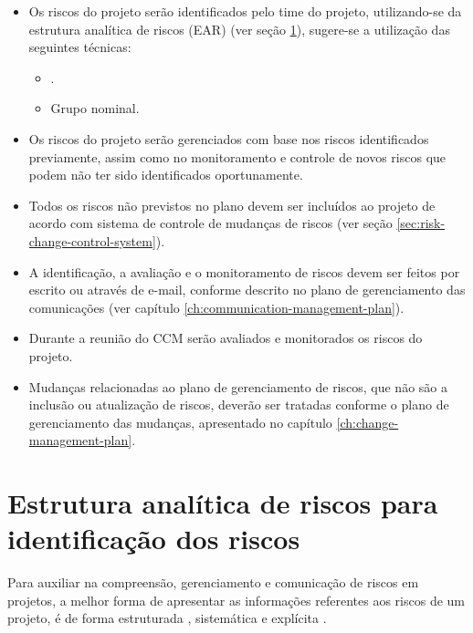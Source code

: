 \begin{itemize}
	\item Os riscos do projeto serão identificados pelo time do projeto, utilizando-se da estrutura analítica de riscos (EAR) (ver seção \ref{sec:rbs}), sugere-se a utilização das seguintes técnicas:
	      \begin{itemize}
		      \item {}.
		      \item Grupo nominal.
	      \end{itemize}
	\item Os riscos do projeto serão gerenciados com base nos riscos identificados previamente, assim como no monitoramento e controle de novos riscos que podem não ter sido identificados oportunamente.
	\item Todos os riscos não previstos no plano devem ser incluídos ao projeto de acordo com sistema de controle de mudanças de riscos (ver seção \ref{sec:risk-change-control-system}).
	\item A identificação, a avaliação e o monitoramento de riscos devem ser feitos por escrito ou através de e-mail, conforme descrito no plano de gerenciamento das comunicações (ver capítulo \ref{ch:communication-management-plan}).
	\item Durante a reunião do CCM serão avaliados e monitorados os riscos do projeto.
	\item Mudanças relacionadas ao plano de gerenciamento de riscos, que não são a inclusão ou atualização de riscos,  deverão ser tratadas conforme o plano de gerenciamento das mudanças, apresentado no capítulo \ref{ch:change-management-plan}.
\end{itemize}

\section{Estrutura analítica de riscos para identificação dos riscos}
\label{sec:rbs}

Para auxiliar na compreensão, gerenciamento e comunicação de riscos em projetos, a melhor forma de apresentar as informações referentes aos riscos de um projeto, é de forma estruturada \cite{hillson2002risk}, sistemática e explícita \cite{gusmao2007modelo}.

